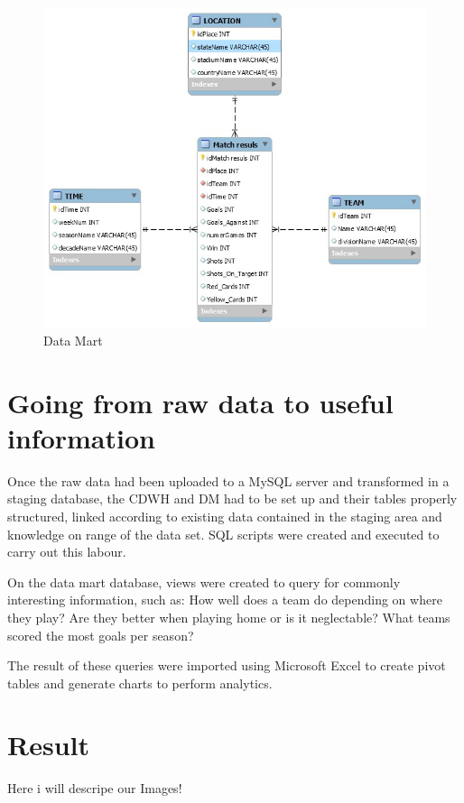 \documentclass[11pt, journal]{IEEEtran}
\begin{document}
\begin{figure}[htb]
	\centering
		\includegraphics[width=1.0\columnwidth]{images/datamart}
	\caption{Data Mart}
	\label{fig:probov}
\end{figure}
\section{Going from raw data to useful information} \label{sec:further}
	
Once the raw data had been uploaded to a MySQL server and transformed in a staging database, the CDWH and DM had to be set up and their tables
properly structured, linked according to existing data contained in the staging area and knowledge on range of the data set. SQL scripts were 
created and executed to carry out this labour. 

On the data mart database, views were created to query for commonly interesting information, such as: How well does a team do depending on where
they play? Are they better when playing home or is it neglectable? What teams scored the most goals per season?

The result of these queries were imported using Microsoft Excel to create pivot tables and generate charts to perform analytics.

\section{Result} \label{sec:further}
Here i will descripe our Images!
\end{document}
